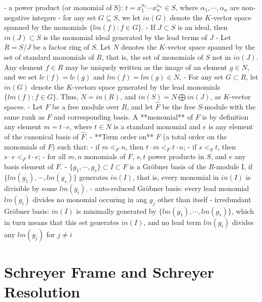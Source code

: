 \documentclass{article}
\theoremstyle{definition}
\theoremstyle{remark}
\theoremstyle{example}
\begin{document}
- a power product (or monomial of S): $t = x_1^{\alpha_1}\cdots x_n^{\alpha_n} \in S$, where $\alpha_1, \cdots, \alpha_n$ are non-negative integers
- for any set $G \subseteq S$, we let $in(G)$ denote the $K$-vector space spanned by the monomials $\{lm(f):f \in G\}$.
- If $J \subset S$ is an ideal, then $in(J) \subset S$ is the monomial ideal generated by the lead terms of $J$
- Let $R = S/J$ be a factor ring of $S$. Let $N$ denotes the $K$-vector space spanned by the set of standard monomials of $R$, that is, the set of monomials of $S$ not in $in(J)$. Any element $f \in R$ may be uniquely written as the image of an element $g \in N$, and we set $lc(f) = lc(g)$ and $lm(f) = lm(g) \in N$.
- For any set $G \subset R$, let $in(G)$ denote the $K$-vectors space generated by the lead monomials $\{lm(f):f\in G\}$. Thus, $N = in(R)$, and $in(S) = N \bigoplus in(J)$, as $K$-vector spaces.
- Let $F$ be a free module over $R$, and let $\hat{F}$ be the free $S$-module with the same rank as $F$ and corresponding basis. A **monomial** of $F$ is by definition any element $m = t \cdot e$, where $t \in N$ is a standard monomial and $e$ is any element of the canonical basis of $\hat{F}$.
- **Term order on** $F$ (a total order on the monomials of $F$) such that:
    - if $m <_F n$, then $t\cdot m <_F t \cdot n$;
    - if $s <_S t$, then $s\cdot e <_F t \cdot e$;
- for all $m, n$ monomials of $F$, $s,t$ power products in $S$, and $e$ any basis element of $F$.
- $\{g_1, \cdots, g_s\} \subset I\subset F$ is a Gröbner basis of the $R$-module I, if $\{lm(g_1), \cdots, lm(g_s)\}$ generates $in(I)$, that is, every monomial in $in(I)$ is divisible by some $lm(g_i)$.
- auto-reduced Gröbner basis: every lead monomial $lm(g_i)$ divides no monomial occuring in ang $g_j$ other than itself
- irredundant Gröbner basis: $in(I)$ is minimally generated by $\{lm(g_1), \cdots, lm(g_s)\}$, which in turn means that this set generates $in(I)$, and no lead term $lm(g_i)$ divides any $lm(g_j)$ for $j \neq i$

\section{Schreyer Frame and Schreyer Resolution}
\end{document}
